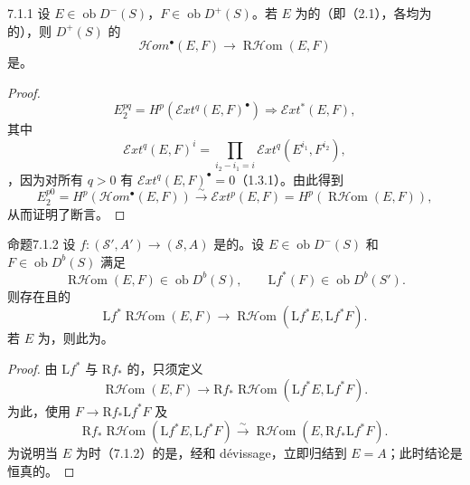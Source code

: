 \begin{SGAresult}{}{7.1.1}
设 $E\in\operatorname{ob}D^-(S)$，$F\in\operatorname{ob}D^+(S)$。若 $E$ 为的（即（2.1），各均为的），则 $D^+(S)$ 的
\[\mathcal Hom^\bullet(E,F)\longrightarrow\operatorname{R\mathcal Hom}(E,F)\]
是。
\end{SGAresult}
\begin{proof}
\[E_2^{pq}=H^p(\mathcal Ext^q(E,F)^\bullet)\Longrightarrow\mathcal Ext^*(E,F),\]
其中
\[\mathcal Ext^q(E,F)^i=\prod_{i_2-i_1=i}\mathcal Ext^q(E^{i_1},F^{i_2}),\]
，因为对所有 $q>0$ 有 $\mathcal Ext^q(E,F)^\bullet=0$（1.3.1）。由此得到
\[E_2^{p0}=H^p(\mathcal Hom^\bullet(E,F))\xrightarrow{\sim}\mathcal Ext^p(E,F)=H^p(\operatorname{R\mathcal Hom}(E,F)),\]
从而证明了断言。
\end{proof}

\begin{SGAresult}{命题}{7.1.2}
设 $f:(\mathscr S',A')\to(\mathscr S,A)$ 是的。设 $E\in\operatorname{ob}D^-(S)$ 和 $F\in\operatorname{ob}D^b(S)$ 满足
\[\operatorname{R\mathcal Hom}(E,F)\in\operatorname{ob}D^b(S),\qquad\mathrm Lf^*(F)\in\operatorname{ob}D^b(S').\]
则存在且的
\[\mathrm Lf^*\operatorname{R\mathcal Hom}(E,F)\longrightarrow\operatorname{R\mathcal Hom}(\mathrm Lf^*E,\mathrm Lf^*F).\]
若 $E$ 为，则此为。
\end{SGAresult}
\begin{proof}
由 $\mathrm Lf^*$ 与 $\mathrm Rf_*$ 的，只须定义
\[\operatorname{R\mathcal Hom}(E,F)\longrightarrow\mathrm Rf_*\operatorname{R\mathcal Hom}(\mathrm Lf^*E,\mathrm Lf^*F).\]
为此，使用 $F\to\mathrm Rf_*\mathrm Lf^*F$ 及
\[\mathrm Rf_*\operatorname{R\mathcal Hom}(\mathrm Lf^*E,\mathrm Lf^*F)\xrightarrow{\sim}\operatorname{R\mathcal Hom}(E,\mathrm Rf_*\mathrm Lf^*F).\]
为说明当 $E$ 为时（7.1.2）的是，经和 dévissage，立即归结到 $E=A$；此时结论是恒真的。
\end{proof}

